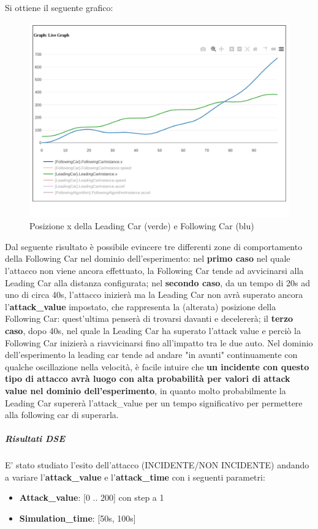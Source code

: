 Si ottiene il seguente grafico:
\begin{figure}[H]
	\centering
	\includegraphics[width=\textwidth]{img/AttackXSimulation.png}
	\caption{Posizione x della Leading Car (verde) e Following Car (blu)}
\end{figure}
Dal seguente risultato è possibile evincere tre differenti zone di comportamento della Following Car nel dominio dell'esperimento: nel \textbf{primo caso} nel quale l'attacco non viene ancora effettuato, la Following Car tende ad avvicinarsi alla Leading Car alla distanza configurata; nel \textbf{secondo caso}, da un tempo di 20s ad uno di circa 40s, l'attacco inizierà ma la Leading Car non avrà superato ancora l'\textbf{attack\_value} impostato, che rappresenta la (alterata) posizione della Following Car: quest'ultima penserà di trovarsi davanti e decelererà; il \textbf{terzo caso}, dopo 40s, nel quale la Leading Car ha superato l'attack value e perciò la Following Car inizierà a riavvicinarsi fino all'impatto tra le due auto.
Nel dominio dell'esperimento la leading car tende ad andare "in avanti" continuamente con qualche oscillazione nella velocità, è facile intuire che \textbf{un incidente con questo tipo di attacco avrà luogo con alta probabilità per valori di attack value nel dominio dell'esperimento}, in quanto molto probabilmente la Leading Car supererà l'attack\_value per un tempo significativo per permettere alla following car di superarla.  
\subparagraph{Risultati DSE}
E' stato studiato l'esito dell'attacco (INCIDENTE/NON INCIDENTE) andando a variare l'\textbf{attack\_value} e l'\textbf{attack\_time} con i seguenti parametri:
\begin{itemize}
	\item \textbf{Attack\_value}: [0 .. 200] con step a 1
	\item \textbf{Simulation\_time}: [50s, 100s]
\end{itemize}
 
